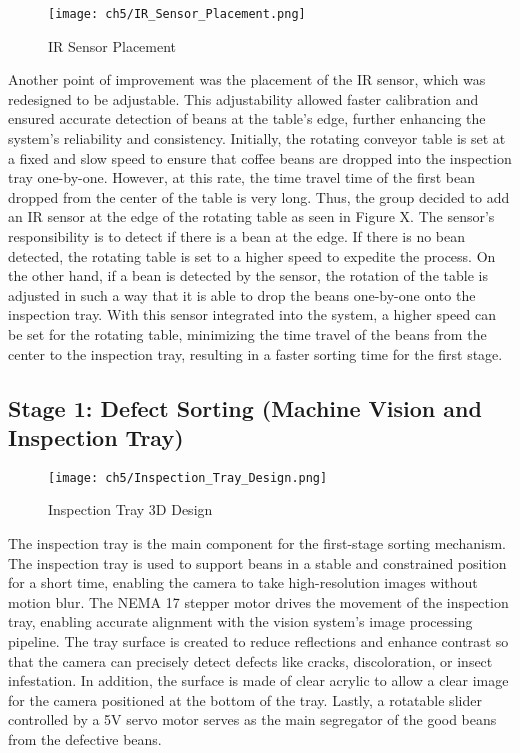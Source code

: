 \begin{figure}[H]
    \centering
    \texttt{[image: ch5/IR\_Sensor\_Placement.png]}
    \caption{IR Sensor Placement}
    \label{fig:ir_sensor_placement}
\end{figure}
Another point of improvement was the placement of the IR sensor, which was redesigned to be adjustable. This adjustability allowed faster calibration and ensured accurate detection of beans at the table’s edge, further enhancing the system’s reliability and consistency. Initially, the rotating conveyor table is set at a fixed and slow speed to ensure that coffee beans are dropped into the inspection tray one-by-one. However, at this rate, the time travel time of the first bean dropped from the center of the table is very long. Thus, the group decided to add an IR sensor at the edge of the rotating table as seen in Figure X. The sensor’s responsibility is to detect if there is a bean at the edge. If there is no bean detected, the rotating table is set to a higher speed to expedite the process. On the other hand, if a bean is detected by the sensor, the rotation of the table is adjusted in such a way that it is able to drop the beans one-by-one onto the inspection tray. With this sensor integrated into the system, a higher speed can be set for the rotating table, minimizing the time travel of the beans from the center to the inspection tray, resulting in a faster sorting time for the first stage.

\subsection{Stage 1: Defect Sorting (Machine Vision and Inspection Tray)}

\begin{figure}[H]
    \centering
    \texttt{[image: ch5/Inspection\_Tray\_Design.png]}
    \caption{Inspection Tray 3D Design}
    \label{fig:inspection_tray_design}
\end{figure}

The inspection tray is the main component for the first-stage sorting mechanism. The inspection tray is used to support beans in a stable and constrained position for a short time, enabling the camera to take high-resolution images without motion blur. The NEMA 17 stepper motor drives the movement of the inspection tray, enabling accurate alignment with the vision system's image processing pipeline. The tray surface is created to reduce reflections and enhance contrast so that the camera can precisely detect defects like cracks, discoloration, or insect infestation. In addition, the surface is made of clear acrylic to allow a clear image for the camera positioned at the bottom of the tray. Lastly, a rotatable slider controlled by a 5V servo motor serves as the main segregator of the good beans from the defective beans. 

